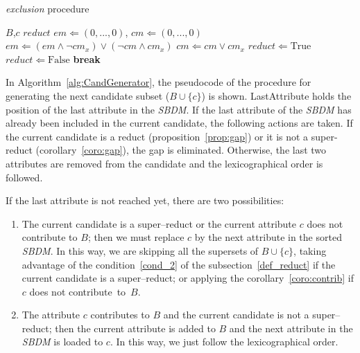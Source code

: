 \documentclass[number,preprint,review,12pt]{elsarticle}
\begin{document}
	\begin{algorithm}
	\footnotesize
	\caption{\textit{exclusion} procedure}
	\label{alg:exclusion}
	\begin{algorithmic}[1]
		\Require $B$,$c$
		\Ensure $reduct$
		\State $em \Leftarrow (0,...,0)$, $cm \Leftarrow (0,...,0)$
		 \label{line:em} 
			\State $em \Leftarrow (em\wedge \neg 
					cm_x) \vee (\neg cm \wedge cm_x)$
			\State $cm \Leftarrow cm \vee cm_x$\label{line:emEnd}
		\EndFor
		\State $reduct \Leftarrow \mathrm{True}$\label{line:reduct}
		  
				\State $reduct \Leftarrow \mathrm{False}$
				\State \textbf{break}\label{line:reductEnd}
			\EndIf
		\EndFor
	\end{algorithmic}
	\end{algorithm}
	
	In Algorithm~\ref{alg:CandGenerator}, the pseudocode of the procedure for generating the next candidate subset ($B\cup \lbrace c\rbrace$) is shown. LastAttribute holds the position of the last attribute in the \textit{SBDM}. If the last attribute of the \textit{SBDM} has already been included in the current candidate, the following actions are taken. If the current candidate is a reduct (proposition~\ref{prop:gap}) or it is not a super-reduct (corollary~\ref{coro:gap}), the gap is eliminated.	Otherwise, the last two attributes are removed from the candidate and the lexicographical order is followed. 
	
	If the last attribute is not reached yet, there are two possibilities:			
	\begin{enumerate}
		\item The current candidate is a super--reduct or the current attribute $c$ does not contribute to $B$; then we must replace $c$ by the next attribute in the sorted \textit{SBDM}. In this way, we are skipping all the supersets of $B\cup\lbrace c\rbrace$, taking advantage of the condition~\ref{cond_2} of the subsection~\ref{def_reduct} if the current candidate is a super--reduct; or applying the corollary~\ref{coro:contrib} if $c$ does not contribute~to~$B$.
		\item The attribute $c$ contributes to $B$ and the current candidate is not a super--reduct; then the current attribute is added to $B$ and the next attribute in the \textit{SBDM} is loaded to $c$. In this way, we just follow the lexicographical order.
	\end{enumerate}  	
			
\end{document}
